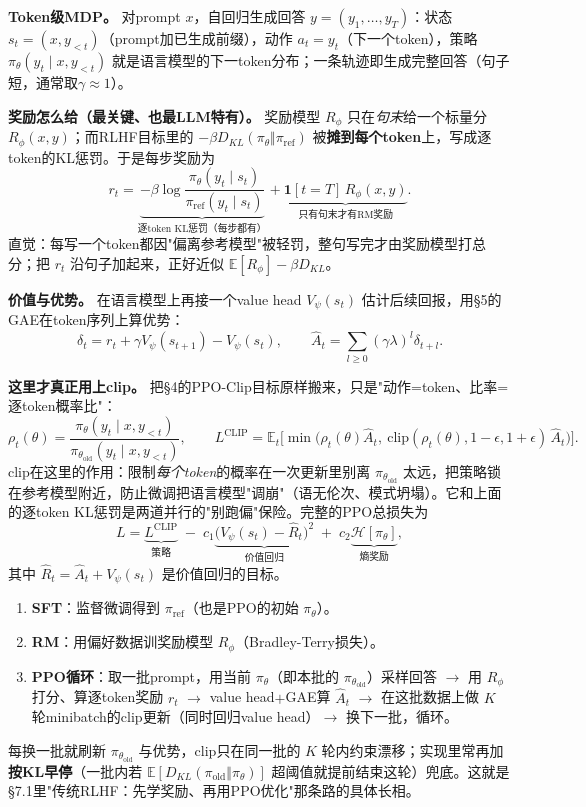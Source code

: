 \documentclass[11pt,a4paper]{article}
\theoremstyle{definition}
\begin{document}
\textbf{Token级MDP。} 对prompt $x$，自回归生成回答 $y=(y_1,\dots,y_T)$：状态 $s_t=(x,y_{<t})$（prompt加已生成前缀），动作 $a_t=y_t$（下一个token），策略 $\pi_\theta(y_t\mid x,y_{<t})$ 就是语言模型的下一token分布；一条轨迹即生成完整回答（句子短，通常取$\gamma\approx1$）。

\textbf{奖励怎么给（最关键、也最LLM特有）。} 奖励模型 $R_\phi$ 只在\emph{句末}给一个标量分 $R_\phi(x,y)$；而RLHF目标里的 $-\beta D_{KL}(\pi_\theta\Vert\pi_{\text{ref}})$ 被\textbf{摊到每个token}上，写成逐token的KL惩罚。于是每步奖励为
\[
r_t=\underbrace{-\beta\log\frac{\pi_\theta(y_t\mid s_t)}{\pi_{\text{ref}}(y_t\mid s_t)}}_{\text{逐token KL惩罚（每步都有）}}+\underbrace{\mathbf{1}[t=T]\,R_\phi(x,y)}_{\text{只有句末才有RM奖励}}.
\]
直觉：每写一个token都因"偏离参考模型"被轻罚，整句写完才由奖励模型打总分；把 $r_t$ 沿句子加起来，正好近似 $\mathbb{E}[R_\phi]-\beta D_{KL}$。

\textbf{价值与优势。} 在语言模型上再接一个value head $V_\psi(s_t)$ 估计后续回报，用\S5的GAE在token序列上算优势：
\[
\delta_t=r_t+\gamma V_\psi(s_{t+1})-V_\psi(s_t),\qquad \hat A_t=\sum_{l\ge0}(\gamma\lambda)^l\delta_{t+l}.
\]

\textbf{这里才真正用上clip。} 把\S4的PPO-Clip目标原样搬来，只是"动作=token、比率=逐token概率比"：
\[
\rho_t(\theta)=\frac{\pi_\theta(y_t\mid x,y_{<t})}{\pi_{\theta_{\text{old}}}(y_t\mid x,y_{<t})},\qquad
L^{\text{CLIP}}=\mathbb{E}_t\Big[\min\!\big(\rho_t(\theta)\hat A_t,\ \mathrm{clip}(\rho_t(\theta),1-\epsilon,1+\epsilon)\,\hat A_t\big)\Big].
\]
clip在这里的作用：限制\emph{每个token}的概率在一次更新里别离 $\pi_{\theta_{\text{old}}}$ 太远，把策略锁在参考模型附近，防止微调把语言模型"调崩"（语无伦次、模式坍塌）。它和上面的逐token KL惩罚是两道并行的"别跑偏"保险。完整的PPO总损失为
\[
L=\underbrace{L^{\text{CLIP}}}_{\text{策略}}\;-\;c_1\underbrace{\big(V_\psi(s_t)-\hat R_t\big)^2}_{\text{价值回归}}\;+\;c_2\underbrace{\mathcal{H}[\pi_\theta]}_{\text{熵奖励}},
\]
其中 $\hat R_t=\hat A_t+V_\psi(s_t)$ 是价值回归的目标。

\begin{keypoint}
\begin{enumerate}
\item \textbf{SFT}：监督微调得到 $\pi_{\text{ref}}$（也是PPO的初始 $\pi_\theta$）。
\item \textbf{RM}：用偏好数据训奖励模型 $R_\phi$（Bradley-Terry损失）。
\item \textbf{PPO循环}：取一批prompt，用当前 $\pi_\theta$（即本批的 $\pi_{\theta_{\text{old}}}$）采样回答 $\to$ 用 $R_\phi$ 打分、算逐token奖励 $r_t$ $\to$ value head$+$GAE算 $\hat A_t$ $\to$ 在这批数据上做 $K$ 轮minibatch的clip更新（同时回归value head）$\to$ 换下一批，循环。
\end{enumerate}
每换一批就刷新 $\pi_{\theta_{\text{old}}}$ 与优势，clip只在同一批的 $K$ 轮内约束漂移；实现里常再加\textbf{按KL早停}（一批内若 $\mathbb{E}[D_{KL}(\pi_{\text{old}}\Vert\pi_\theta)]$ 超阈值就提前结束这轮）兜底。这就是\S7.1里"传统RLHF：先学奖励、再用PPO优化"那条路的具体长相。
\end{keypoint}
\end{document}
